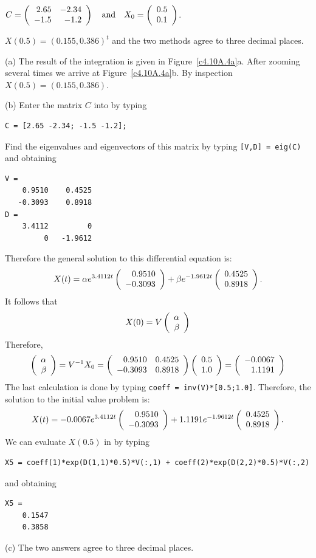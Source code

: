 \documentclass{ximera}
\begin{document}
\begin{computerExercise}  \label{c4.10A.4a}  
$C = \left(\begin{array}{rr} 2.65 & -2.34\\ -1.5 &-1.2\end{array}\right) \quad\mbox{and}\quad X_0=\left(\begin{array}{r} 0.5 \\ 0.1\end{array}\right)$.

\begin{solution}
\ans $X(0.5) = (0.155,0.386)^t$ and the two methods agree to three 
decimal places.

\soln (a) The result of the {\pplane} integration is given in 
Figure~\ref{c4.10A.4a}a. After zooming several times we arrive at
Figure~\ref{c4.10A.4a}b.  By inspection $X(0.5)=(0.155,0.386)$.

(b)  Enter the matrix $C$ into \Matlab by typing
\begin{verbatim}
C = [2.65 -2.34; -1.5 -1.2];
\end{verbatim}
Find the eigenvalues and eigenvectors of this matrix by typing {\tt [V,D] = eig(C)}
and obtaining
\begin{verbatim}
V =
    0.9510    0.4525
   -0.3093    0.8918
D =
    3.4112         0
         0   -1.9612
\end{verbatim}
Therefore the general solution to this differential equation is:
\[
X(t) = \alpha e^{3.4112 t}\left(\begin{array}{r} 0.9510 \\ -0.3093\end{array}\right) +
\beta e^{-1.9612 t}\left(\begin{array}{r} 0.4525 \\ 0.8918\end{array}\right).
\]
It follows that 
\[
X(0) = V \left(\begin{array}{r} \alpha \\ \beta\end{array}\right)
\]
Therefore,
\[
\left(\begin{array}{r} \alpha \\ \beta\end{array}\right) = V^{-1} X_0 = 
\left(\begin{array}{rr} 0.9510 & 0.4525\\ -0.3093 &0.8918\end{array}\right)\left(\begin{array}{r} 0.5 \\ 1.0\end{array}\right) = \left(\begin{array}{r} -0.0067 \\ 1.1191\end{array}\right)
\]
The last calculation is done by typing {\tt coeff = inv(V)*[0.5;1.0]}. 
Therefore, the solution to the initial value problem is:
\[
X(t) = -0.0067e^{3.4112 t}\left(\begin{array}{r} 0.9510 \\ -0.3093\end{array}\right) +
1.1191e^{-1.9612 t}\left(\begin{array}{r} 0.4525 \\ 0.8918\end{array}\right).
\]
We can evaluate $X(0.5)$ in \Matlab by typing
\begin{verbatim}
X5 = coeff(1)*exp(D(1,1)*0.5)*V(:,1) + coeff(2)*exp(D(2,2)*0.5)*V(:,2)
\end{verbatim}
and obtaining
\begin{verbatim}
X5 =
    0.1547
    0.3858
\end{verbatim}


(c)  The two answers agree to three decimal places.


\end{solution}
\end{computerExercise}
\end{document}
